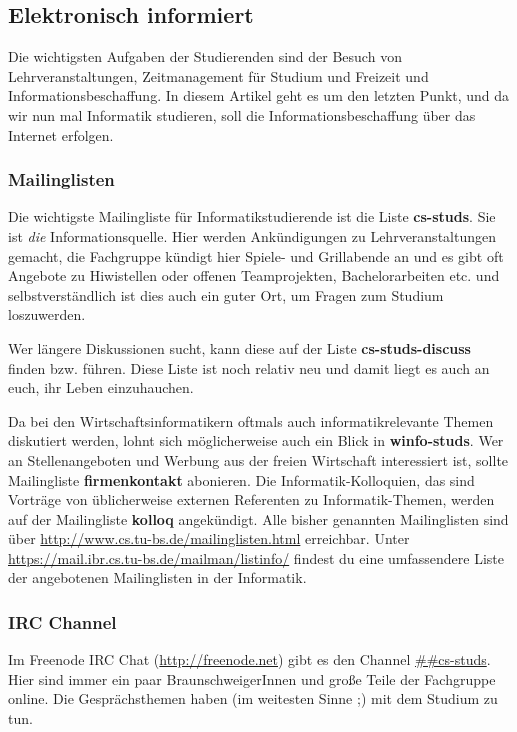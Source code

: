 \subsection{Elektronisch informiert}
	\label{elekinf}
	Die wichtigsten Aufgaben der Studierenden sind der Besuch von Lehrveranstaltungen, Zeitmanagement für Studium und Freizeit und Informationsbeschaffung. In diesem Artikel geht es um den letzten Punkt, und da wir nun mal Informatik studieren, soll die Informationsbeschaffung über das Internet erfolgen.

	\subsubsection*{Mailinglisten}
	\label{mailinglisten}
		Die wichtigste Mailingliste für Informatikstudierende ist die Liste \textbf{cs-studs}. Sie ist \emph{die} Informationsquelle. Hier werden Ankündigungen zu Lehrveranstaltungen gemacht, die Fachgruppe kündigt hier Spiele- und Grillabende an und es gibt oft Angebote zu Hiwistellen oder offenen Teamprojekten, Bachelorarbeiten etc. und selbstverständlich ist dies auch ein guter Ort, um Fragen zum Studium loszuwerden.

		Wer längere Diskussionen sucht, kann diese auf der Liste \textbf{cs-studs-discuss} finden bzw. führen. Diese Liste ist noch relativ neu und damit liegt es auch an euch, ihr Leben einzuhauchen.

		Da bei den Wirtschaftsinformatikern oftmals auch informatikrelevante Themen diskutiert werden, lohnt sich möglicherweise auch ein Blick in \textbf{winfo-studs}. 
		Wer an Stellenangeboten und Werbung aus der freien
		Wirtschaft interessiert ist, sollte Mailingliste
		\textbf{firmenkontakt} abonieren. Die
		Informatik-Kolloquien, das sind Vorträge von
		üblicherweise externen Referenten zu Informatik-Themen,
		werden auf der Mailingliste \textbf{kolloq} angekündigt.
		Alle bisher genannten Mailinglisten sind über
		\url{http://www.cs.tu-bs.de/mailinglisten.html}
		erreichbar. Unter
		\url{https://mail.ibr.cs.tu-bs.de/mailman/listinfo/}
		findest du eine umfassendere Liste der angebotenen Mailinglisten in der Informatik.

	\subsubsection*{IRC Channel}
		Im Freenode IRC Chat (\url{http://freenode.net}) gibt es den Channel \url{##cs-studs}. Hier sind immer ein paar BraunschweigerInnen und große Teile der Fachgruppe online. Die Gesprächsthemen haben (im weitesten Sinne ;) mit dem Studium zu tun.


